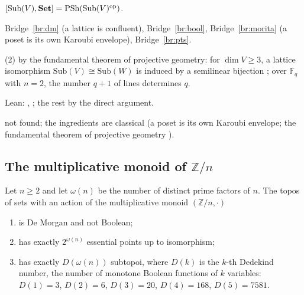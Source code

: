 \begin{trace}
\item[deck] $[\mathrm{Sub}(V),\mathbf{Set}] = \mathrm{PSh}(\mathrm{Sub}(V)^{\mathrm{op}})$.
\item[arch] Bridge~\ref{br:dm} (a lattice is confluent), Bridge~\ref{br:bool}, Bridge~\ref{br:morita} (a poset is its own Karoubi envelope), Bridge~\ref{br:pts}.
\item[rewrite] (2) by the fundamental theorem of projective geometry: for $\dim V\ge 3$, a lattice isomorphism $\mathrm{Sub}(V)\cong\mathrm{Sub}(W)$ is induced by a semilinear bijection \cite{artin-geometric}; over $\mathbb F_q$ with $n = 2$, the number $q+1$ of lines determines $q$.
\item[verify] Lean: , ; the rest by the direct argument.
\item[novelty] not found; the ingredients are classical (a poset is its own Karoubi envelope; the fundamental theorem of projective geometry \cite{artin-geometric}).
\end{trace}

\subsection{The multiplicative monoid of $\mathbb Z/n$}

\begin{theorem}\label{th:zn}
Let $n\ge 2$ and let $\omega(n)$ be the number of distinct prime factors of $n$. The topos of sets with an action of the multiplicative monoid $(\mathbb Z/n,\cdot)$
\begin{enumerate}
\item is De Morgan and not Boolean;
\item has exactly $2^{\omega(n)}$ essential points up to isomorphism;
\item has exactly $D(\omega(n))$ subtopoi, where $D(k)$ is the $k$-th Dedekind number, the number of monotone Boolean functions of $k$ variables: $D(1) = 3$, $D(2) = 6$, $D(3) = 20$, $D(4) = 168$, $D(5) = 7581$.
\end{enumerate}
\end{theorem}

